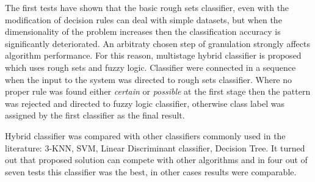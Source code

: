 The first tests have shown that the basic rough sets classifier, even with the
modification of decision rules can deal with simple datasets, but when the
dimensionality of the problem increases then the classification accuracy is
significantly deteriorated. An arbitraty chosen step of granulation strongly
affects algorithm performance. For this reason, multistage hybrid classifier
is proposed which uses rough sets and fuzzy logic. Classifier were connected in
a sequence when the input to the system was directed to rough sets classifier. Where no
proper rule was found either \textit{certain} or \textit{possible} at the first
stage then the pattern was rejected and directed to fuzzy logic classifier,
otherwise class label was assigned by the first classifier as the final result.

Hybrid classifier was compared with other classifiers commonly used in the literature:
3-KNN, SVM, Linear Discriminant classifier, Decision Tree. It turned out that
proposed solution can compete with other algorithms and in four out of seven
tests this classifier was the best, in other cases results were comparable.
